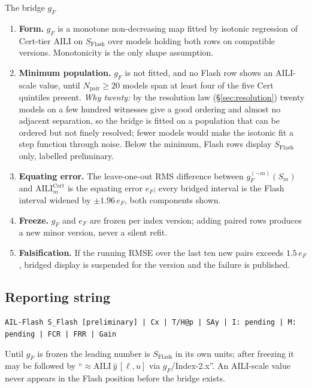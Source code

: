 \begin{claimbox}{The bridge $g_F$}
\begin{enumerate}[leftmargin=1.4em,itemsep=2pt]
\item \textbf{Form.} $g_F$ is a monotone non-decreasing map fitted by isotonic regression of Cert-tier AILI on $S_{\mathrm{Flash}}$ over models holding both rows on compatible versions. Monotonicity is the only shape assumption.
\item \textbf{Minimum population.} $g_F$ is not fitted, and no Flash row shows an AILI-scale value, until $N_{\text{pair}} \ge 20$ models span at least four of the five Cert quintiles present. \emph{Why twenty:} by the resolution law (\S\ref{sec:resolution}) twenty models on a few hundred witnesses give a good ordering and almost no adjacent separation, so the bridge is fitted on a population that can be ordered but not finely resolved; fewer models would make the isotonic fit a step function through noise. Below the minimum, Flash rows display $S_{\mathrm{Flash}}$ only, labelled preliminary.
\item \textbf{Equating error.} The leave-one-out RMS difference between $g_F^{(-m)}(S_m)$ and $\mathrm{AILI}_m^{\mathrm{Cert}}$ is the equating error $e_F$; every bridged interval is the Flash interval widened by $\pm 1.96\,e_F$, both components shown.
\item \textbf{Freeze.} $g_F$ and $e_F$ are frozen per index version; adding paired rows produces a new minor version, never a silent refit.
\item \textbf{Falsification.} If the running RMSE over the last ten new pairs exceeds $1.5\,e_F$, bridged display is suspended for the version and the failure is published.
\end{enumerate}
\end{claimbox}

\subsection{Reporting string}
\begin{center}\small
\texttt{AIL-Flash S\_Flash [preliminary] | Cx | T/H@p | SAy | I: pending | M: pending | FCR | FRR | Gain}
\end{center}
Until $g_F$ is frozen the leading number is $S_{\mathrm{Flash}}$ in its own units; after freezing it may be followed by ``$\approx\mathrm{AILI}\ \hat y\,[\ell, u]$ via $g_F$/Index-2.x''. An AILI-scale value never appears in the Flash position before the bridge exists.

